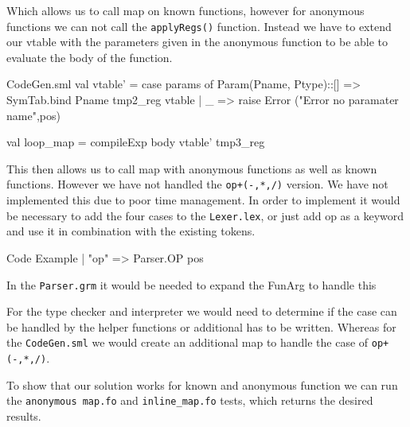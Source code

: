 \documentclass[11pt,a4paper,oneside]{report}
\begin{document}
Which allows us to call map on known functions, however for anonymous functions we can not call the \texttt{applyRegs()} function. Instead we have to extend our vtable with the parameters given in the anonymous function to be able to evaluate the body of the function.
\begin{code}[firstnumber=612]{CodeGen.sml}
  val vtable' = case params of
                  Param(Pname, Ptype)::[]   => SymTab.bind Pname tmp2_reg vtable
                | _ => raise Error ("Error no paramater name",pos)

  val loop_map = compileExp body vtable' tmp3_reg
\end{code}

This then allows us to call map with anonymous functions as well as known functions. However we have not handled the \texttt{op+(-,*,/)} version. We have not implemented this due to poor time management.
In order to implement it would be necessary to add the four cases to the \texttt{Lexer.lex}, or just add op as a keyword and use it in combination with the existing tokens.
\begin{code}{Code Example}
       | "op"         => Parser.OP pos
\end{code}
In the \texttt{Parser.grm} it would be needed to expand the FunArg to handle this
For the type checker and interpreter we would need to determine if the case can be handled by the helper functions or additional has to be written. Whereas for the \texttt{CodeGen.sml} we would create an additional map to handle the case of \texttt{op+(-,*,/)}.


To show that our solution works for known and anonymous function we can run the \texttt{anonymous map.fo} and \texttt{inline\_map.fo} tests, which returns the desired results.
\end{document}
